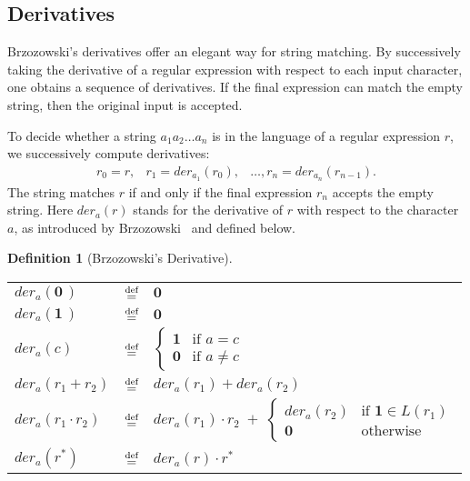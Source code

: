 \documentclass[12pt]{article}
\newtheorem{definition}{Definition} %
\newcommand{\dn}{\ensuremath{\stackrel{\mbox{\scriptsize def}}{=}}}
\newcommand{\ZERO}{\textbf{0}}
\newcommand{\ONE}{\textbf{1}}
\newcommand{\der}{\textit{der}}
\begin{document}
\subsection{Derivatives}

Brzozowski’s derivatives offer an elegant way for string matching. By successively taking the derivative of a regular
expression with respect to each input character, one obtains a sequence of derivatives. If the final expression can match 
the empty string, then the original input is accepted.

To decide whether a string $a_1 a_2 \dots a_n$ is in the language of a regular expression $r$, we successively 
compute derivatives:
\[
\begin{array}{rcl}
r_0 = r,& r_1 = \der_{a_1}(r_0),& \dots, r_n = \der_{a_n}(r_{n-1}) .
\end{array}
\]
The string matches $r$ if and only if the final expression $r_n$ accepts the empty string. Here $\der_a(r)$ stands for the derivative of $r$ with respect to the character
$a$, as introduced by Brzozowski~\cite{Brzozowski1964} and defined below.


\begin{definition}[Brzozowski’s Derivative]\mbox{}

  \renewcommand{\arraystretch}{1.5}
  \begin{tabular}{lcl}
    $\der_a(\ZERO\,)$            & \dn & $\ZERO$ \\
    $\der_a(\ONE\,)$             & \dn & $\ZERO$ \\
    $\der_a(c)$                  & \dn &
      $\begin{cases}
        \ONE  & \text{if } a = c \\
        \ZERO & \text{if } a \neq c
      \end{cases}$ \\
    $\der_a(r_1 + r_2)$          & \dn & $\der_a(r_1) + \der_a(r_2)$ \\
    $\der_a(r_1 \cdot r_2)$      & \dn &
      $\der_a(r_1) \cdot r_2 \;+\;
        \begin{cases}
          \der_a(r_2) & \text{if } \ONE \in L(r_1) \\
          \ZERO       & \text{otherwise}
        \end{cases}$ \\
    $\der_a(r^\ast)$             & \dn & $\der_a(r) \cdot r^\ast$
  \end{tabular}
  \renewcommand{\arraystretch}{1.0}
\end{definition}
\end{document}
